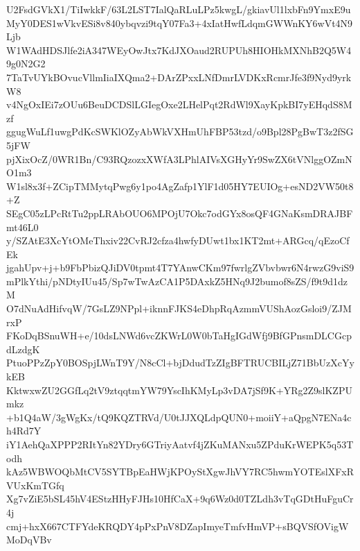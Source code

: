 U2FsdGVkX1/TiIwkkF/63L2LST7IalQaRLuLPz5kwgL/gkiavUl1lxbFn9YmxE9u
MyY0DES1wVkvESi8v840ybqvzi9tqY07Fa3+4xIatHwfLdqmGWWnKY6wVt4N9Ljb
W1WAdHDSJlfe2iA347WEyOwJtx7KdJXOaud2RUPUh8HIOHkMXNhB2Q5W49g0N2G2
7TaTvUYkBOvucVllmIiaIXQma2+DArZPxxLNfDmrLVDKxRcmrJfe3f9Nyd9yrkW8
v4NgOxIEi7zOUu6BeuDCDSlLGIegOxe2LHelPqt2RdWl9XayKpkBI7yEHqdS8Mzf
ggugWuLf1uwgPdKcSWKlOZyAbWkVXHmUhFBP53tzd/o9Bpl28PgBwT3z2fSG5jFW
pjXixOcZ/0WR1Bn/C93RQzozxXWfA3LPhlAIVsXGHyYr9SwZX6tVNlggOZmNO1m3
W1sl8x3f+ZCipTMMytqPwg6y1po4AgZafp1YlF1d05HY7EUIOg+esND2VW50t8+Z
SEgC05zLPcRtTu2ppLRAbOUO6MPOjU7Okc7odGYx8osQF4GNaKsmDRAJBFmt46L0
y/SZAtE3XcYtOMeThxiv22CvRJ2cfza4hwfyDUwt1bx1KT2mt+ARGcq/qEzoCfEk
jgahUpv+j+b9FbPbizQJiDV0tpmt4T7YAnwCKm97fwrlgZVbvbwr6N4rwzG9viS9
mPlkYthi/pNDtyIUu45/Sp7wTwAzCA1P5DAxkZ5HNq9J2bumof8sZS/f9t9d1dzM
O7dNuAdHifvqW/7GsLZ9NPpl+iknnFJKS4eDhpRqAzmmVUShAozGsloi9/ZJMrxP
FKoDqBSnuWH+e/10dsLNWd6vcZKWrL0W0bTaHgIGdWfj9BfGPnsmDLCGcpdLzdgK
PtuoPPzZpY0BOSpjLWnT9Y/N8cCl+bjDdudTzZIgBFTRUCBILjZ71BbUzXcYykEB
KktwxwZU2GGfLq2tV9ztqqtmYW79YscIhKMyLp3vDA7jSf9K+YRg2Z9slKZPUmkz
+b1Q4aW/3gWgKx/tQ9KQZTRVd/U0tJJXQLdpQUN0+moiiY+aQpgN7ENa4ch4Rd7Y
iY1AehQaXPPP2RItYn82YDry6GTriyAatvf4jZKuMANxu5ZPduKrWEPK5q53Todh
kAz5WBWOQbMtCV5SYTBpEaHWjKPOyStXgwJhVY7RC5hwmYOTEslXFxRVUxKmTGfq
Xg7vZiE5bSL45hV4EStzHHyFJHs10HfCaX+9q6Wz0d0TZLdh3vTqGDtHuFguCr4j
cmj+hxX667CTFYdeKRQDY4pPxPnV8DZapImyeTmfvHmVP+sBQVSfOVigWMoDqVBv
